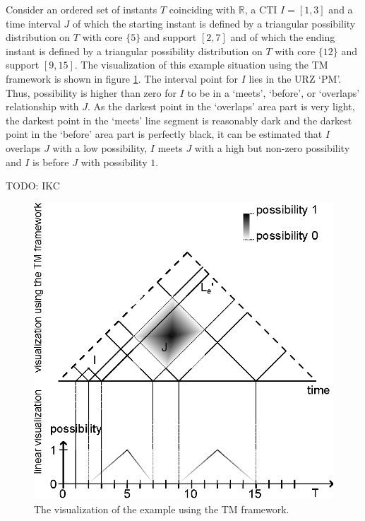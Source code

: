 \begin{example}
Consider an ordered set of instants $T$ coinciding with $\mathbb{R}$, a CTI $I = \left[1, 3\right]$ and a time interval $J$ of which the starting instant is defined by a triangular possibility distribution on $T$ with core $\{5\}$ and support $\left[2, 7\right]$ and of which the ending instant is defined by a triangular possibility distribution on $T$ with core $\{12\}$ and support $\left[9, 15\right]$. The visualization of this example situation using the TM framework is shown in figure \ref{fig:ex}. The interval point for $I$ lies in the URZ `PM'. Thus, possibility is higher than zero for $I$ to be in a `meets', `before', or `overlaps' relationship with $J$. As the darkest point in the `overlaps' area part is very light, the darkest point in the `meets' line segment is reasonably dark and the darkest point in the `before' area part is perfectly black, it can be estimated that $I$ overlaps $J$ with a low possibility, $I$ meets $J$ with a high but non-zero possibility and $I$ is before $J$ with possibility $1$.

TODO: IKC

\end{example}

\begin{figure}[h]
	\centering
	\includegraphics[width=0.9\columnwidth]{graphs/example_image.eps}
	\caption{The visualization of the example using the TM framework.}
	\label{fig:ex}
\end{figure}
 
